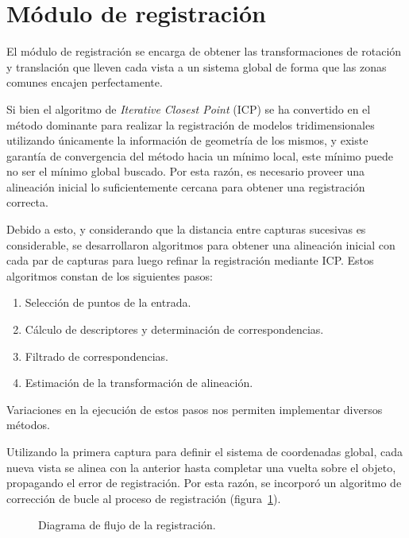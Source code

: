 \section{Módulo de registración}
	El módulo de registración se encarga de obtener las transformaciones de rotación y translación
	que lleven cada vista a un sistema global de forma
	que las zonas comunes encajen perfectamente.

	Si bien
	el algoritmo de \emph{Iterative Closest Point} (ICP) se ha convertido en el
	método dominante para realizar la registración de modelos tridimensionales
	utilizando únicamente la información de geometría de los mismos\cite{Rusinkiewicz02real-time3d},
	y existe garantía de convergencia del método hacia un mínimo local,
	este mínimo puede no ser el mínimo global buscado.
	Por esta razón,
	es necesario proveer una alineación inicial
	lo suficientemente cercana para obtener una registración correcta\cite{regBesl92}.

	Debido a esto, y considerando que la distancia entre capturas sucesivas es considerable,
	se desarrollaron algoritmos para obtener una alineación inicial
	con cada par de capturas para luego refinar la registración mediante ICP.
	Estos algoritmos constan de los siguientes pasos:
	\begin{enumerate}
		\item Selección de puntos de la entrada.
		\item Cálculo de descriptores y determinación de correspondencias.
		\item Filtrado de correspondencias.
		\item Estimación de la transformación de alineación.
	\end{enumerate}
	Variaciones en la ejecución de estos pasos nos permiten implementar diversos métodos.

	Utilizando la primera captura para definir el sistema de coordenadas
	global, cada nueva vista se alinea con la anterior hasta completar una
	vuelta sobre el objeto, propagando el error de registración.
	Por esta razón, se incorporó un algoritmo de corrección de bucle al proceso de registración
	(figura~\ref{fig:flow_registracion}).

	\begin{figure}
		\caption[Diagrama de flujo de la registración]{\label{fig:flow_registracion}Diagrama de flujo de la registración.}
	\end{figure}

